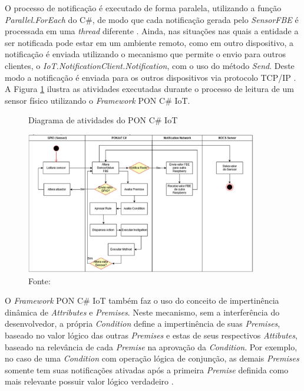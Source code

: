 O processo de notificação é executado de forma paralela, utilizando a função
\textit{Parallel.ForEach} do C\#, de modo que cada notificação gerada pelo
\textit{SensorFBE} é processada em uma \textit{thread} diferente
\cite{msc_oliveira_2019}. Ainda, nas situações nas quais a entidade a ser
notificada pode estar em um ambiente remoto, como em outro dispositivo, a
notificação é enviada utilizando o mecanismo que permite o envio para outros
clientes, o \textit{IoT.NotificationClient.Notification}, com o uso do método
\textit{Send}. Deste modo a notificação é enviada para os outros dispositivos
via protocolo TCP/IP \cite{msc_oliveira_2019}. A Figura \ref{fig:ativ_pon_iot}
ilustra as atividades executadas durante o processo de leitura de um sensor
físico utilizando o \textit{Framework} PON C\# IoT.

\begin{figure}[!htb]
  \centering
  \caption{Diagrama de atividades do PON C\# IoT}
  \includegraphics[width=0.9\textwidth]{../figures/pon_iot_flow.png}
  \caption*{Fonte: }
  \label{fig:ativ_pon_iot}
\end{figure}

O \textit{Framework} PON C\# IoT também faz o uso do conceito de impertinência
dinâmica de \textit{Attributes} e \textit{Premises}. Neste mecanismo, sem a
interferência do desenvolvedor, a própria \textit{Condition} define a
impertinência de suas \textit{Premises}, baseado no valor lógico das outras
\textit{Premises} e estas de seus respectivos \textit{Attibutes}, baseado na
relevância de cada \textit{Premise} na aprovação da \textit{Condition}. Por
exemplo, no caso de uma \textit{Condition} com operação lógica de conjunção, as
demais \textit{Premises} somente tem suas notificações ativadas após a primeira
\textit{Premise} definida como mais relevante possuir valor lógico verdadeiro
\cite{msc_oliveira_2019}. 

